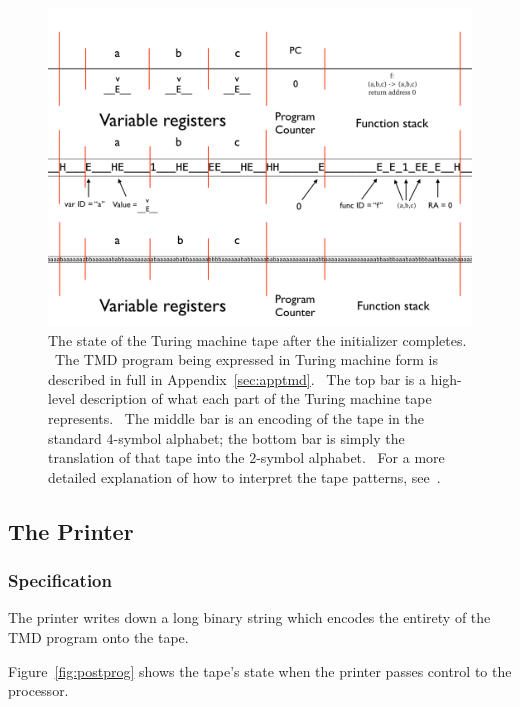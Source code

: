\documentclass[11pt]{article}
\begin{document}
\begin{figure}
\begin{center}
\includegraphics[scale=0.42]{figs/postinit.png}
\caption{The state of the Turing machine tape after the initializer completes. \ The TMD program being expressed in Turing machine form is described in full in Appendix~\ref{sec:apptmd}. \ The top bar is a high-level description of what each part of the Turing machine tape represents. \ The middle bar is an encoding of the tape in the standard $4$-symbol alphabet; the bottom bar is simply the translation of that tape into the $2$-symbol alphabet. \ For a more detailed explanation of how to interpret the tape patterns, see~\cite{github}. \label{fig:postinit}}
\end{center}
\end{figure}

\subsection{The Printer} \label{sec:introspect}

\subsubsection{Specification}

The printer writes down a long binary string which encodes the entirety of the TMD program onto the tape.

Figure~\ref{fig:postprog} shows the tape's state when the printer passes control to the processor.
\end{document}
